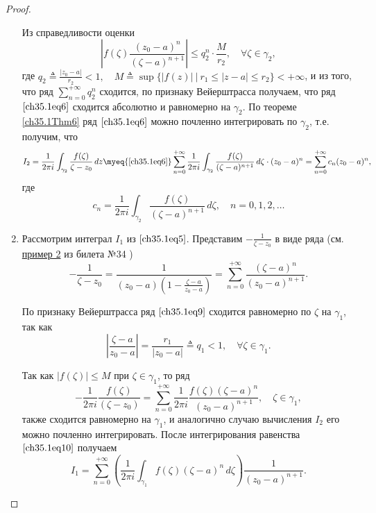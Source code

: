 \begin{proof}
\begin{enumerate}
Из справедливости оценки
$$
\left| f(\zeta) \frac{(z_0 - a)^n}{(\zeta - a)^{n + 1}}\right| \le q_{2}^n \cdot \frac{M}{r_2}, \quad \forall \zeta \in \gamma_2,
$$
где $q_2 \triangleq \frac{|z_0 - a|}{r_2} < 1, \quad M \triangleq \sup \{ |f(z)| \: \big| \: r_1 \le |z - a| \le r_2\} < +\infty$, и из того, что ряд $\sum\limits_{n = 0}^{+\infty} q_{2}^n$ сходится, по признаку Вейерштрасса получаем, что ряд $\eqref{ch35.1eq6}$ сходится абсолютно и равномерно на $\gamma_2$. По теореме \ref{ch35.1Thm6}  ряд $\eqref{ch35.1eq6}$ можно почленно интегрировать по $\gamma_2$, т.е. получим, что 
\begin{equation} \label{ch35.1eq7}
I_2 = \frac{1}{2\pi i} \int_{\gamma_2} \frac{f(\zeta)}{\zeta - z_0} \,d z \myeq{\eqref{ch35.1eq6}} \sum\limits_{n = 0}^{+\infty} \frac{1}{2\pi i} \int_{\gamma_2} \frac{f(\zeta)}{(\zeta - a)^{n + 1}} \,d\zeta \cdot (z_0 - a)^n = \sum\limits_{n = 0}^{+\infty} c_n (z_0 - a)^n,
\end{equation}
где 
\begin{equation} \label{ch35.1eq8}
c_n = \frac{1}{2\pi i} \int_{\gamma_2}  \frac{f(\zeta)}{(\zeta - a)^{n + 1}} \,d\zeta, \quad n = 0,1,2,\ldots
\end{equation}

\item

Рассмотрим интеграл $I_1$ из $\eqref{ch35.1eq5}$. Представим $-\frac{1}{\zeta - z_0}$ в виде ряда (см. \hyperref[exmpl2]{пример 2} из билета №34 )
\begin{equation} \label{ch35.1eq9}
-\frac{1}{\zeta - z_0} = \frac{1}{(z_0 - a) \left( 1 - \frac{\zeta - a}{z_0 - a}\right)} = \sum_{n = 0}^{+\infty} \frac{(\zeta - a)^n}{(z_0 - a)^{n + 1}}.
\end{equation}

По признаку Вейерштрасса ряд $\eqref{ch35.1eq9}$ сходится равномерно по $\zeta$ на $\gamma_1$, так как
$$
\left| \frac{\zeta - a}{z_0 - a}\right| = \frac{r_1}{|z_0 - a|} \triangleq q_1 < 1, \quad \forall \zeta \in \gamma_1.
$$

Так как $|f(\zeta)| \le M$ при $\zeta \in \gamma_1$, то ряд
\begin{equation} \label{ch35.1eq10}
-\frac{1}{2\pi i} \frac{f(\zeta)}{(\zeta - z_0)} = \sum\limits_{n = 0}^{+\infty} \frac{1}{2\pi i} \frac{f(\zeta)(\zeta - a)^n}{(z_0 - a)^{n + 1}}, \quad \zeta \in \gamma_1,
\end{equation}
также сходится равномерно на $\gamma_1$, и аналогично случаю вычисления $I_2$ его можно почленно интегрировать. После интегрирования равенства $\eqref{ch35.1eq10}$ получаем
\begin{equation} \label{ch35.1eq11}
I_1 = \sum\limits_{n = 0}^{+\infty} \left( \frac{1}{2\pi i} \int_{\gamma_1} f(\zeta)(\zeta - a)^n \,d\zeta\right) \frac{1}{(z_0 - a)^{n + 1}}.
\end{equation}


\end{enumerate}
\end{proof}
